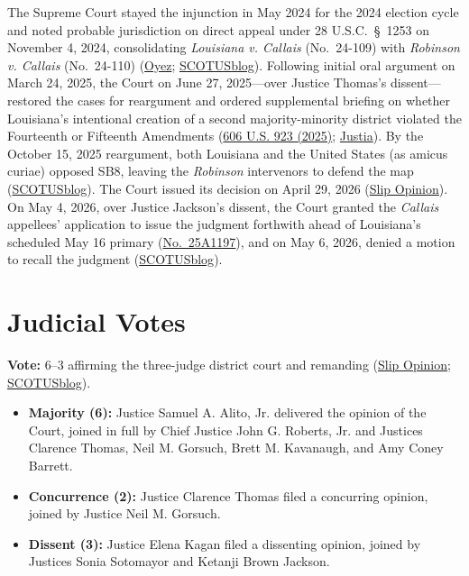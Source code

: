 \documentclass[12pt]{article}
\begin{document}
The Supreme Court stayed the injunction in May 2024 for the 2024 election cycle and noted probable jurisdiction on direct appeal under 28 U.S.C.~\S~1253 on November 4, 2024, consolidating \textit{Louisiana v. Callais} (No.~24-109) with \textit{Robinson v. Callais} (No.~24-110) (\href{https://www.oyez.org/cases/2025/24-109}{Oyez}; \href{https://www.scotusblog.com/2026/04/in-major-voting-rights-act-case-supreme-court-strikes-down-redistricting-map-challenged-as-racia/}{SCOTUSblog}). Following initial oral argument on March 24, 2025, the Court on June 27, 2025---over Justice Thomas's dissent---restored the cases for reargument and ordered supplemental briefing on whether Louisiana's intentional creation of a second majority-minority district violated the Fourteenth or Fifteenth Amendments (\href{https://www.supremecourt.gov/opinions/24pdf/24-109_l53m.pdf}{606 U.S. 923 (2025)}; \href{https://supreme.justia.com/cases/federal/us/608/24-109/}{Justia}). By the October 15, 2025 reargument, both Louisiana and the United States (as amicus curiae) opposed SB8, leaving the \textit{Robinson} intervenors to defend the map (\href{https://www.scotusblog.com/2026/04/in-major-voting-rights-act-case-supreme-court-strikes-down-redistricting-map-challenged-as-racia/}{SCOTUSblog}). The Court issued its decision on April 29, 2026 (\href{https://www.supremecourt.gov/opinions/25pdf/24-109_21o3.pdf}{Slip Opinion}). On May 4, 2026, over Justice Jackson's dissent, the Court granted the \textit{Callais} appellees' application to issue the judgment forthwith ahead of Louisiana's scheduled May 16 primary (\href{https://www.supremecourt.gov/opinions/25pdf/25a1197_h31i.pdf}{No.~25A1197}), and on May 6, 2026, denied a motion to recall the judgment (\href{https://www.scotusblog.com/2026/05/court-gives-immediate-effect-to-voting-rights-act-decision/}{SCOTUSblog}).

\section{Judicial Votes}

\textbf{Vote:} 6--3 affirming the three-judge district court and remanding (\href{https://www.supremecourt.gov/opinions/25pdf/24-109_21o3.pdf}{Slip Opinion}; \href{https://www.scotusblog.com/cases/louisiana-v-callais-2/}{SCOTUSblog}).

\begin{itemize}
    \item \textbf{Majority (6):} Justice Samuel A. Alito, Jr. delivered the opinion of the Court, joined in full by Chief Justice John G. Roberts, Jr. and Justices Clarence Thomas, Neil M. Gorsuch, Brett M. Kavanaugh, and Amy Coney Barrett.
    \item \textbf{Concurrence (2):} Justice Clarence Thomas filed a concurring opinion, joined by Justice Neil M. Gorsuch.
    \item \textbf{Dissent (3):} Justice Elena Kagan filed a dissenting opinion, joined by Justices Sonia Sotomayor and Ketanji Brown Jackson.
\end{itemize}
\end{document}
